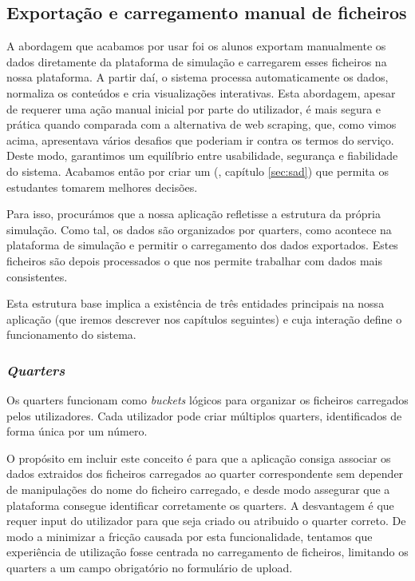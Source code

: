 \subsection{Exportação e carregamento manual de ficheiros}

A abordagem que acabamos por usar foi os alunos exportam manualmente os dados diretamente da plataforma de simulação e carregarem esses ficheiros na nossa plataforma. A partir daí, o sistema processa automaticamente os dados, normaliza os conteúdos e cria visualizações interativas. Esta abordagem, apesar de requerer uma ação manual inicial por parte do utilizador, é mais segura e prática quando comparada com a alternativa de web scraping, que, como vimos acima, apresentava vários desafios que poderiam ir contra os termos do serviço. Deste modo, garantimos um equilíbrio entre usabilidade, segurança e fiabilidade do sistema. Acabamos então por criar um  (\cf, capítulo \ref{sec:sad}) que permita os estudantes tomarem melhores decisões.


Para isso, procurámos que a nossa aplicação refletisse a estrutura da própria simulação. Como tal, os dados são organizados por quarters, como acontece na plataforma de simulação e permitir o carregamento dos dados exportados. Estes ficheiros são depois processados o que nos permite trabalhar com dados mais consistentes. 

Esta estrutura base implica a existência de três entidades principais na nossa aplicação (que iremos descrever nos capítulos seguintes) e cuja interação define o funcionamento do sistema.


\subsubsection{\textit{Quarters}}
Os quarters funcionam como \textit{buckets} lógicos para organizar os ficheiros carregados pelos utilizadores. Cada utilizador pode criar múltiplos quarters, identificados de forma única por um número.

O propósito em incluir este conceito é para que a aplicação consiga associar os dados extraidos dos ficheiros carregados ao quarter correspondente sem depender de manipulações do nome do ficheiro carregado, e desde modo assegurar que a plataforma consegue identificar corretamente os quarters. A desvantagem é que requer input do utilizador para que seja criado ou atribuido o quarter correto. De modo a minimizar a fricção causada por esta funcionalidade, tentamos que experiência de utilização fosse centrada no carregamento de ficheiros, limitando os quarters a um campo obrigatório no formulário de upload.

